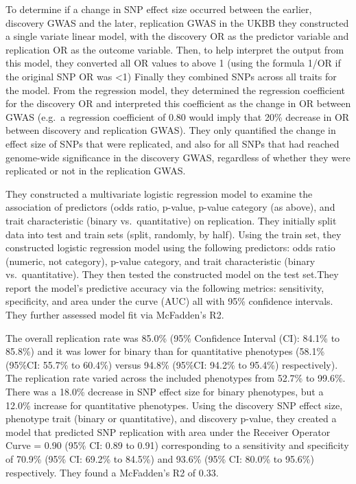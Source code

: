 \documentclass[
]{book}
\begin{document}
To determine if a change in SNP effect size occurred between the earlier, discovery GWAS and the later, replication GWAS in the UKBB they constructed a single variate linear model, with the discovery OR as the predictor variable and replication OR as the outcome variable. Then, to help interpret the output from this model, they converted all OR values to above 1 (using the formula 1/OR if the original SNP OR was \textless1) Finally they combined SNPs across all traits for the model. From the regression model, they determined the regression coefficient for the discovery OR and interpreted this coefficient as the change in OR between GWAS (e.g.~a regression coefficient of 0.80 would imply that 20\% decrease in OR between discovery and replication GWAS). They only quantified the change in effect size of SNPs that were replicated, and also for all SNPs that had reached genome-wide significance in the discovery GWAS, regardless of whether they were replicated or not in the replication GWAS.

They constructed a multivariate logistic regression model to examine the association of predictors (odds ratio, p-value, p-value category (as above), and trait characteristic (binary vs.~quantitative) on replication. They initially split data into test and train sets (split, randomly, by half). Using the train set, they constructed logistic regression model using the following predictors: odds ratio (numeric, not category), p-value category, and trait characteristic (binary vs.~quantitative). They then tested the constructed model on the test set.They report the model's predictive accuracy via the following metrics: sensitivity, specificity, and area under the curve (AUC) all with 95\% confidence intervals. They further assessed model fit via McFadden's R2.

The overall replication rate was 85.0\% (95\% Confidence Interval (CI): 84.1\% to 85.8\%) and it was lower for binary than for quantitative phenotypes (58.1\% (95\%CI: 55.7\% to 60.4\%) versus 94.8\% (95\%CI: 94.2\% to 95.4\%) respectively). The replication rate varied across the included phenotypes from 52.7\% to 99.6\%. There was a 18.0\% decrease in SNP effect size for binary phenotypes, but a 12.0\% increase for quantitative phenotypes. Using the discovery SNP effect size, phenotype trait (binary or quantitative), and discovery p-value, they created a model that predicted SNP replication with area under the Receiver Operator Curve = 0.90 (95\% CI: 0.89 to 0.91) corresponding to a sensitivity and specificity of 70.9\% (95\% CI: 69.2\% to 84.5\%) and 93.6\% (95\% CI: 80.0\% to 95.6\%) respectively. They found a McFadden's R2 of 0.33.
\end{document}
